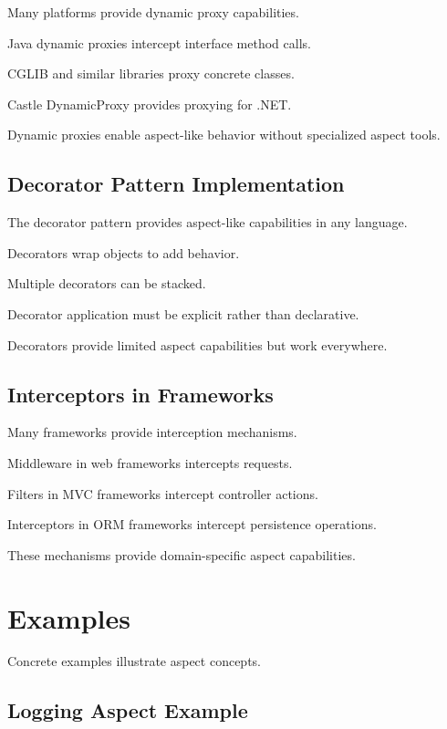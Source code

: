 \documentclass[11pt]{article}
\begin{document}
Many platforms provide dynamic proxy capabilities.

Java dynamic proxies intercept interface method calls.

CGLIB and similar libraries proxy concrete classes.

Castle DynamicProxy provides proxying for .NET.

Dynamic proxies enable aspect-like behavior without specialized aspect tools.

\subsection{Decorator Pattern Implementation}

The decorator pattern provides aspect-like capabilities in any language.

Decorators wrap objects to add behavior.

Multiple decorators can be stacked.

Decorator application must be explicit rather than declarative.

Decorators provide limited aspect capabilities but work everywhere.

\subsection{Interceptors in Frameworks}

Many frameworks provide interception mechanisms.

Middleware in web frameworks intercepts requests.

Filters in MVC frameworks intercept controller actions.

Interceptors in ORM frameworks intercept persistence operations.

These mechanisms provide domain-specific aspect capabilities.

\section{Examples}

Concrete examples illustrate aspect concepts.

\subsection{Logging Aspect Example}
\end{document}
